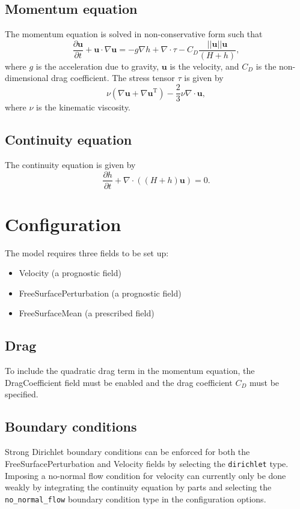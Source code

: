 \documentclass[a4paper,11pt]{report}
\begin{document}
\subsection{Momentum equation}
The momentum equation is solved in non-conservative form such that
\begin{equation}
   \frac{\partial \mathbf{u}}{\partial t} + \mathbf{u}\cdot\nabla\mathbf{u} = -g\nabla h + \nabla\cdot\tau - C_D\frac{||\mathbf{u}||\mathbf{u}}{(H + h)},
\end{equation}
where $g$ is the acceleration due to gravity, $\mathbf{u}$ is the velocity, and $C_D$ is the non-dimensional drag coefficient. The stress tensor $\tau$ is given by 
\begin{equation}
   \nu\left(\nabla\mathbf{u} + \nabla\mathbf{u}^{\mathrm{T}}\right) - \frac{2}{3}\nu\nabla\cdot\mathbf{u},
\end{equation}
where $\nu$ is the kinematic viscosity.

\subsection{Continuity equation}
The continuity equation is given by
\begin{equation}
   \frac{\partial h}{\partial t} + \nabla\cdot\left(\left(H + h\right)\mathbf{u}\right) = 0.
\end{equation}

\section{Configuration}
The model requires three fields to be set up:
\begin{itemize}
   \item Velocity (a prognostic field)
   \item FreeSurfacePerturbation (a prognostic field)
   \item FreeSurfaceMean (a prescribed field)
\end{itemize}

\subsection{Drag}
To include the quadratic drag term in the momentum equation, the DragCoefficient field must be enabled and the drag coefficient $C_D$ must be specified.

\subsection{Boundary conditions}
Strong Dirichlet boundary conditions can be enforced for both the FreeSurfacePerturbation and Velocity fields by selecting the \texttt{dirichlet} type. Imposing a no-normal flow condition for velocity can currently only be done weakly by integrating the continuity equation by parts and selecting the \texttt{no\_normal\_flow} boundary condition type in the configuration options.
\end{document}
